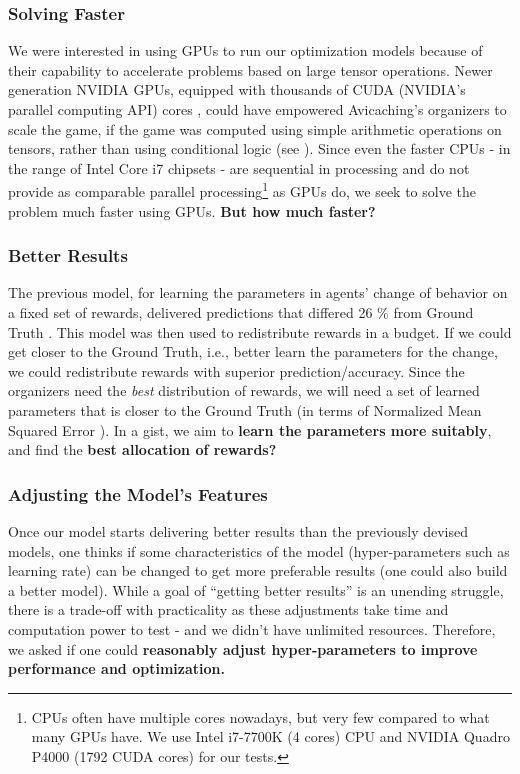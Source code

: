 \documentclass[12pt]{article}
\begin{document}
    \subsubsection{Solving Faster} \label{sec:Important Questions - Solving Faster}
    We were interested in using GPUs to run our optimization models because of their capability to accelerate problems based on large tensor operations. Newer generation NVIDIA GPUs, equipped with thousands of CUDA (NVIDIA's parallel computing API) cores \cite{NVIDIA}, could have empowered Avicaching's organizers to scale the game, if the game was computed using simple arithmetic operations on tensors, rather than using conditional logic (see ). Since even the faster CPUs - in the range of Intel Core i7 chipsets - are sequential in processing and do not provide as comparable parallel processing\footnote{CPUs often have multiple cores nowadays, but very few compared to what many GPUs have. We use Intel i7-7700K (4 cores) CPU and NVIDIA Quadro P4000 (1792 CUDA cores) for our tests.} as GPUs do, we seek to solve the problem much faster using GPUs. \textbf{But how much faster?}
    
    \subsubsection{Better Results} \label{sec:Important Questions - Better Results}
    The previous model, for learning the parameters in agents' change of behavior on a fixed set of rewards, delivered predictions that differed 26 \% from Ground Truth \cite[Table 1]{Xue2016Avi2}. This model was then used to redistribute rewards in a budget. If we could get closer to the Ground Truth, i.e., better learn the parameters for the change, we could redistribute rewards with superior prediction/accuracy. Since the organizers need the \textit{best} distribution of rewards, we will need a set of learned parameters that is closer to the Ground Truth (in terms of Normalized Mean Squared Error \cite[Section 4.2]{Xue2016Avi2}). In a gist, we aim to \textbf{learn the parameters more suitably}, and find the \textbf{best allocation of rewards?}
    
    \subsubsection{Adjusting the Model's Features} \label{sec:Important Questions - Adjusting the Model's Features}
    Once our model starts delivering better results than the previously devised models, one thinks if some characteristics of the model (hyper-parameters such as learning rate) can be changed to get more preferable results (one could also build a better model). While a goal of ``getting better results'' is an unending struggle, there is a trade-off with practicality as these adjustments take time and computation power to test - and we didn't have unlimited resources. Therefore, we asked if one could \textbf{reasonably adjust hyper-parameters to improve performance and optimization.}
    
\end{document}
